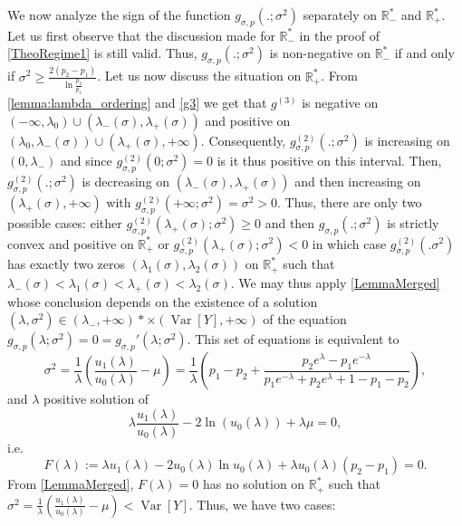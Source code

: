\documentclass[a4paper, 10pt]{article}
\newcommand{\beq}{\begin{equation}}
\newcommand{\eeq}{\end{equation}}
\theoremstyle{definition}
\begin{document}
We now analyze the sign of the function  $g_{\sigma, p}(.;\sigma^2)$  separately  on $\mathbb{R}_-^*$ and $\mathbb{R}_+^*$. Let us first observe that the discussion made for $\mathbb{R}_-^*$ in the proof of \autoref{TheoRegime1} is still valid. Thus, $g_{\sigma, p}(.;\sigma^2)$ is non-negative on $\mathbb{R}_-^*$ if and only if $\sigma^2\geq \frac{2(p_2-p_1)}{\ln \frac{p_2}{p_1}}$. Let us now discuss the situation on $\mathbb{R}_+^*$. From \autoref{lemma:lambda_ordering} and \eqref{g3} we get that $g^{(3)}$ is negative on $(-\infty,\lambda_0)\cup\left(\lambda_-(\sigma),\lambda_+(\sigma)\right)$  and positive on $(\lambda_0,\lambda_-(\sigma))\cup\left(\lambda_+(\sigma),+\infty\right)$. Consequently, $g^{(2)}_{\sigma, p}(.;\sigma^2)$ is increasing on $(0,\lambda_-)$ and since $g^{(2)}_{\sigma, p}(0;\sigma^2)=0$ is it thus positive on this interval. Then, $g_{\sigma, p}^{(2)}(.;\sigma^2)$ is decreasing on $(\lambda_-(\sigma),\lambda_+(\sigma))$ and then increasing on $(\lambda_+(\sigma),+\infty)$ with $g_{\sigma, p}^{(2)}(+\infty;\sigma^2)=\sigma^2>0$. Thus, there are only two possible cases: either $g_{\sigma, p}^{(2)}(\lambda_+(\sigma);\sigma^2)\geq 0$ and then $g_{\sigma, p}(.;\sigma^2)$ is strictly convex and positive on $\mathbb{R}_+^*$ or $g^{(2)}_{\sigma, p}(\lambda_+(\sigma);\sigma^2)<0$ in which case $g_{\sigma, p}^{(2)}(.\sigma^2)$ has exactly two zeros $(\lambda_1(\sigma),\lambda_2(\sigma))$ on $\mathbb{R}_+^*$ such that $\lambda_-(\sigma)<\lambda_1(\sigma)<\lambda_+(\sigma)<\lambda_2(\sigma)$. We may thus apply \autoref{LemmaMerged} whose conclusion depends on the existence of a solution $(\lambda,\sigma^2)\in \left(\lambda_-,+\infty\right)*\times \left(\operatorname{Var}[Y],+\infty\right)$ of the equation $g_{\sigma, p}(\lambda;\sigma^2)=0=g_{\sigma, p}'(\lambda;\sigma^2)$. This set of equations is equivalent to
\beq \sigma^2=\frac{1}{\lambda}\left(\frac{u_1(\lambda)}{u_0(\lambda)}-\mu\right)=\frac{1}{\lambda}\left(p_1-p_2+\frac{p_2e^\lambda-p_1e^{-\lambda}}{p_1e^{-\lambda}+p_2e^{\lambda}+1-p_1-p_2}\right),
\eeq
and $\lambda$ positive solution of
\beq \lambda \frac{u_1(\lambda)}{u_0(\lambda)}- 2\ln (u_0(\lambda))+\lambda \mu=0 ,\eeq
i.e.
\beq \label{EqF} F(\lambda):=\lambda u_1(\lambda)-2u_0(\lambda)\ln u_0(\lambda)+ \lambda u_0(\lambda)(p_2-p_1)=0.\eeq
From \autoref{LemmaMerged}, $F(\lambda)=0$ has no solution on $\mathbb{R}_+^*$ such that $\sigma^2=\frac{1}{\lambda}\left(\frac{u_1(\lambda)}{u_0(\lambda)}-\mu\right)<\operatorname{Var}[Y]$. Thus, we have two cases:
\end{document}
